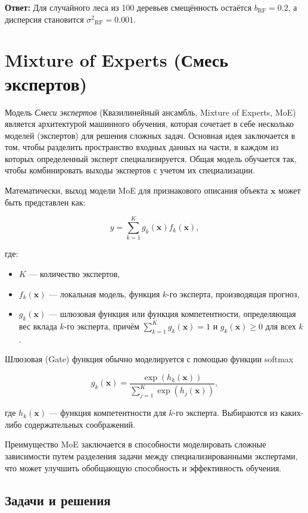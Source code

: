 \textbf{Ответ:} Для случайного леса из 100 деревьев смещённость остаётся \(b_{\text{RF}}=0.2\), а дисперсия становится \({\sigma^2}_{\text{RF}}=0.001\).



\section{Mixture of Experts (Смесь экспертов)}

Модель \textit{Смеси экспертов} (Квазилинейный ансамбль, Mixture of Experts, MoE) является архитектурой машинного обучения, которая сочетает в себе несколько моделей (экспертов) для решения сложных задач. Основная идея заключается в том, чтобы разделить пространство входных данных на части, в каждом из которых определенный эксперт специализируется. Общая модель обучается так, чтобы комбинировать выходы экспертов с учетом их специализации.

Математически, выход модели MoE для признакового описания объекта $\mathbf{x}$ может быть представлен как:

$$
y = \sum_{k=1}^{K} g_k(\mathbf{x}) f_k(\mathbf{x}),
$$

где:
\begin{itemize}
    \item $K$ — количество экспертов,
    \item $f_k(\mathbf{x})$ — локальная модель, функция $k$-го эксперта, производящая прогноз,
    \item $g_k(\mathbf{x})$ — шлюзовая функция или функция компетентности, определяющая вес вклада $k$-го эксперта, причём $\sum_{k=1}^{K} g_k(\mathbf{x}) = 1$ и $g_k(\mathbf{x}) \geq 0$ для всех $k$.
\end{itemize}

Шлюзовая (Gate) функция обычно моделируется с помощью функции softmax

$$
g_k(\mathbf{x}) = \frac{\exp(h_k(\mathbf{x}))}{\sum_{j=1}^{K} \exp(h_j(\mathbf{x}))},
$$

где $h_k(\mathbf{x})$ — функция компетентности для $k$-го эксперта. Выбираются из каких-либо содержательных соображений.

Преимущество MoE заключается в способности моделировать сложные зависимости путем разделения задачи между специализированными экспертами, что может улучшить обобщающую способность и эффективность обучения.

\subsection{Задачи и решения}

